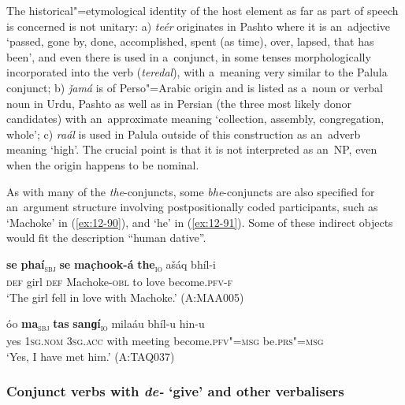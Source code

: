 The historical"=etymological identity of the host element as far as part of speech is concerned is not unitary: a) \textit{teér} originates in Pashto where it is an~adjective `passed, gone by, done, accomplished, spent (as time), over, lapsed, that has been', and even there is used in a~conjunct, in some tenses morphologically incorporated into the verb (\textit{teredal}), with a~meaning very similar to the Palula conjunct; b) \textit{ǰamá} is of Perso"=Arabic origin and is listed as a~noun or verbal noun in Urdu, Pashto as well as in Persian (the three most likely donor candidates) with an~approximate meaning `collection, assembly, congregation, whole'; c) \textit{raál} is used in Palula outside of this construction as an~adverb meaning `high'. The crucial point is that it is not interpreted as an~NP, even when the origin happens to be nominal. 


As with many of the \textit{the}-conjuncts, some \textit{bhe}-conjuncts are also specified for an~argument structure involving postpositionally coded participants, such as `Machoke' in (\ref{ex:12-90}), and `he' in (\ref{ex:12-91}). Some of these indirect objects would fit the description ``human dative''. 

\begin{exe}
\ex
\label{ex:12-90}
\gll {\ob}\textbf{se} \textbf{phaí}{\cb}\textsubscript{\textsc{\upshape sbj}} {\ob}\textbf{se} \textbf{mac̣hook-á} \textbf{the}{\cb}\textsubscript{\textsc{\upshape io}} ašáq bhíl-i\\
\textsc{def} girl \textsc{def} Machoke-\textsc{obl} to love  become.\textsc{pfv-f}\\
\glt `The girl fell in love with Machoke.' (A:MAA005)
\end{exe}
\begin{exe}
\ex
\label{ex:12-91}
\gll óo {\ob}\textbf{ma}{\cb}\textsubscript{\textsc{\upshape sbj}} {\ob}\textbf{tas} \textbf{sanɡí}{\cb}\textsubscript{\textsc{\upshape io}} milaáu bhíl-u hin-u\\
yes \textsc{1sg.nom} \textsc{3sg.acc} with meeting become.\textsc{pfv"=msg}  be.\textsc{prs"=msg}\\
\glt `Yes, I have met him.' (A:TAQ037)
\end{exe}

\subsubsection*{Conjunct verbs with \textit{de-} `give' and other verbalisers}

